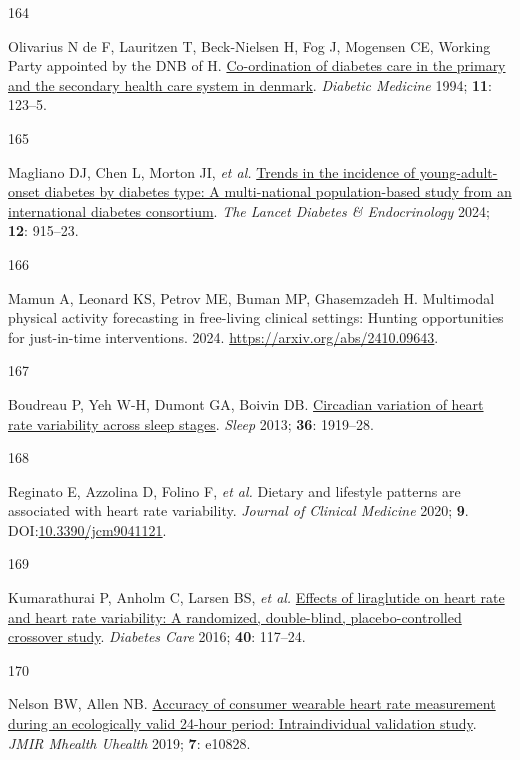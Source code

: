 \documentclass[
  a4paper,
  headsepline=true,
  open=left]{scrbook}
\newlength{\cslhangindent}
\newlength{\csllabelwidth}
\newlength{\cslentryspacingunit} %
\newenvironment{CSLReferences}[2] %
 {%
  \setlength{\parindent}{0pt}
  \ifodd #1
  \let\oldpar\par
  \def\par{\hangindent=\cslhangindent\oldpar}
  \fi
  \setlength{\parskip}{#2\cslentryspacingunit}
 }%
 {}
\newcommand{\CSLLeftMargin}[1]{\parbox[t]{\csllabelwidth}{#1}}
\newcommand{\CSLRightInline}[1]{\parbox[t]{\linewidth - \csllabelwidth}{#1}\break}
\begin{document}
\begin{CSLReferences}{0}{0}
\leavevmode{}%
\CSLLeftMargin{164 }%
\CSLRightInline{Olivarius N de F, Lauritzen T, Beck-Nielsen H, Fog J,
Mogensen CE, Working Party appointed by the DNB of H.
\href{https://doi.org/10.1111/j.1464-5491.1994.tb00243.x}{Co-ordination
of diabetes care in the primary and the secondary health care system in
denmark}. \emph{Diabetic Medicine} 1994; \textbf{11}: 123--5.}

\leavevmode{}%
\CSLLeftMargin{165 }%
\CSLRightInline{Magliano DJ, Chen L, Morton JI, \emph{et al.}
\href{https://doi.org/10.1016/S2213-8587(24)00243-2}{Trends in the
incidence of young-adult-onset diabetes by diabetes type: A
multi-national population-based study from an international diabetes
consortium}. \emph{The Lancet Diabetes \& Endocrinology} 2024;
\textbf{12}: 915--23.}

\leavevmode{}%
\CSLLeftMargin{166 }%
\CSLRightInline{Mamun A, Leonard KS, Petrov ME, Buman MP, Ghasemzadeh H.
Multimodal physical activity forecasting in free-living clinical
settings: Hunting opportunities for just-in-time interventions. 2024.
\url{https://arxiv.org/abs/2410.09643}.}

\leavevmode{}%
\CSLLeftMargin{167 }%
\CSLRightInline{Boudreau P, Yeh W-H, Dumont GA, Boivin DB.
\href{https://doi.org/10.5665/sleep.3230}{Circadian variation of heart
rate variability across sleep stages}. \emph{Sleep} 2013; \textbf{36}:
1919--28.}

\leavevmode{}%
\CSLLeftMargin{168 }%
\CSLRightInline{Reginato E, Azzolina D, Folino F, \emph{et al.} Dietary
and lifestyle patterns are associated with heart rate variability.
\emph{Journal of Clinical Medicine} 2020; \textbf{9}.
DOI:\href{https://doi.org/10.3390/jcm9041121}{10.3390/jcm9041121}.}

\leavevmode{}%
\CSLLeftMargin{169 }%
\CSLRightInline{Kumarathurai P, Anholm C, Larsen BS, \emph{et al.}
\href{https://doi.org/10.2337/dc16-1580}{Effects of liraglutide on heart
rate and heart rate variability: A randomized, double-blind,
placebo-controlled crossover study}. \emph{Diabetes Care} 2016;
\textbf{40}: 117--24.}

\leavevmode{}%
\CSLLeftMargin{170 }%
\CSLRightInline{Nelson BW, Allen NB.
\href{https://doi.org/10.2196/10828}{Accuracy of consumer wearable heart
rate measurement during an ecologically valid 24-hour period:
Intraindividual validation study}. \emph{JMIR Mhealth Uhealth} 2019;
\textbf{7}: e10828.}


\end{CSLReferences}
\end{document}
